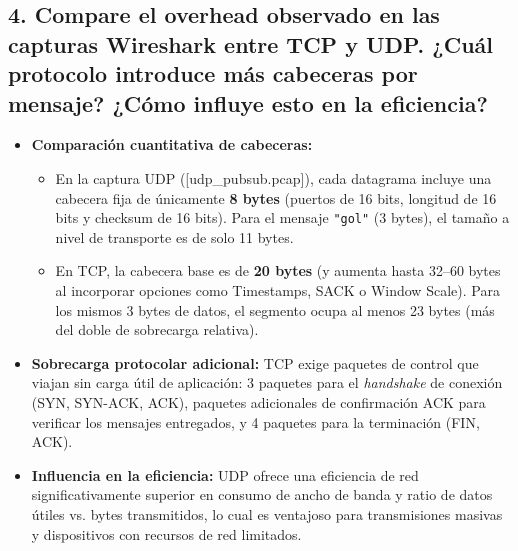 \documentclass[11pt,a4paper]{article}
\begin{document}
\subsection{4. Compare el overhead observado en las capturas Wireshark entre TCP y UDP. ¿Cuál protocolo introduce más cabeceras por mensaje? ¿Cómo influye esto en la eficiencia?}
\begin{itemize}
    \item \textbf{Comparación cuantitativa de cabeceras:} 
    \begin{itemize}
        \item En la captura UDP ([udp\_pubsub.pcap]), cada datagrama incluye una cabecera fija de únicamente \textbf{8 bytes} (puertos de 16 bits, longitud de 16 bits y checksum de 16 bits). Para el mensaje \texttt{"gol"} (3 bytes), el tamaño a nivel de transporte es de solo 11 bytes.
        \item En TCP, la cabecera base es de \textbf{20 bytes} (y aumenta hasta 32--60 bytes al incorporar opciones como Timestamps, SACK o Window Scale). Para los mismos 3 bytes de datos, el segmento ocupa al menos 23 bytes (más del doble de sobrecarga relativa).
    \end{itemize}
    \item \textbf{Sobrecarga protocolar adicional:} TCP exige paquetes de control que viajan sin carga útil de aplicación: 3 paquetes para el \textit{handshake} de conexión (SYN, SYN-ACK, ACK), paquetes adicionales de confirmación ACK para verificar los mensajes entregados, y 4 paquetes para la terminación (FIN, ACK).
    \item \textbf{Influencia en la eficiencia:} UDP ofrece una eficiencia de red significativamente superior en consumo de ancho de banda y ratio de datos útiles vs. bytes transmitidos, lo cual es ventajoso para transmisiones masivas y dispositivos con recursos de red limitados.
\end{itemize}
\end{document}
